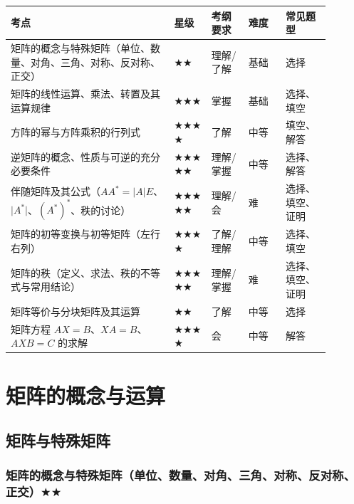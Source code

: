 \documentclass[11pt,openany,UTF8]{ctexbook}
\begin{document}
\begingroup\small\setlength{\tabcolsep}{4.0pt}
\begin{longtable}{@{}L{0.4484\linewidth}L{0.1074\linewidth}L{0.1074\linewidth}L{0.1074\linewidth}L{0.1235\linewidth}@{}}
\toprule
\textbf{考点} & \textbf{星级} & \textbf{考纲要求} & \textbf{难度} & \textbf{常见题型} \\
\midrule
\endhead
矩阵的概念与特殊矩阵（单位、数量、对角、三角、对称、反对称、正交） & $\bigstar$$\bigstar$ & 理解/了解 & 基础 & 选择 \\
矩阵的线性运算、乘法、转置及其运算规律 & $\bigstar$$\bigstar$$\bigstar$ & 掌握 & 基础 & 选择、填空 \\
方阵的幂与方阵乘积的行列式 & $\bigstar$$\bigstar$$\bigstar$$\bigstar$ & 了解 & 中等 & 填空、解答 \\
逆矩阵的概念、性质与可逆的充分必要条件 & $\bigstar$$\bigstar$$\bigstar$$\bigstar$$\bigstar$ & 理解/掌握 & 中等 & 选择、解答 \\
伴随矩阵及其公式（$AA^*=\vert A\vert E$、$\vert A^*\vert$、$(A^*)^*$、秩的讨论） & $\bigstar$$\bigstar$$\bigstar$$\bigstar$$\bigstar$ & 理解/会 & 难 & 选择、填空、证明 \\
矩阵的初等变换与初等矩阵（左行右列） & $\bigstar$$\bigstar$$\bigstar$$\bigstar$ & 了解/理解 & 中等 & 选择、填空 \\
矩阵的秩（定义、求法、秩的不等式与常用结论） & $\bigstar$$\bigstar$$\bigstar$$\bigstar$$\bigstar$ & 理解/掌握 & 难 & 选择、填空、证明 \\
矩阵等价与分块矩阵及其运算 & $\bigstar$$\bigstar$ & 了解 & 中等 & 选择 \\
矩阵方程 $AX=B$、$XA=B$、$AXB=C$ 的求解 & $\bigstar$$\bigstar$$\bigstar$$\bigstar$ & 会 & 中等 & 解答 \\
\bottomrule
\end{longtable}
\endgroup

\section{矩阵的概念与运算}

\subsection{矩阵与特殊矩阵}

\subsubsection{矩阵的概念与特殊矩阵（单位、数量、对角、三角、对称、反对称、正交）$\bigstar$$\bigstar$}
\end{document}

